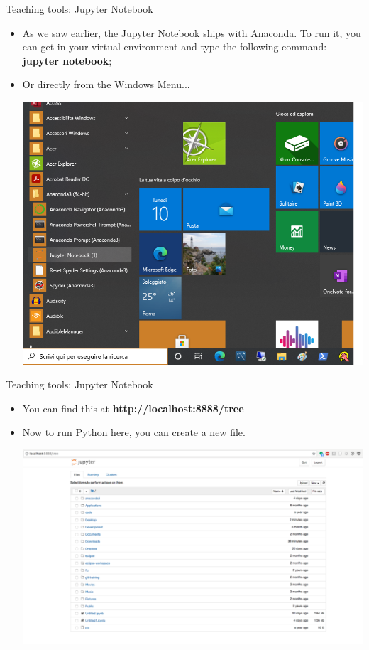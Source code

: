 \documentclass[11pt]{beamer}
\begin{document}
\begin{frame}{Teaching tools: Jupyter Notebook}
\begin{itemize}
\item  As we saw earlier, the Jupyter Notebook ships with Anaconda. To run it, you can get in your virtual environment and type the following command: \textbf{jupyter notebook};
\item Or directly from the Windows Menu...
\begin{center}
\includegraphics[scale=.3]{../05-pictures/lesson-1-1_pic_28.PNG} 
\end{center}
\end{itemize}
\end{frame}
\begin{frame}{Teaching tools: Jupyter Notebook}
\begin{itemize}
\item You can find this at \textbf{http://localhost:8888/tree}
\item Now to run Python here, you can create a new file. 
\begin{center}
\includegraphics[scale=.175]{../05-pictures/lesson-1-1_pic_29.PNG} 
\end{center}
\end{itemize}
\end{frame}
\end{document}
